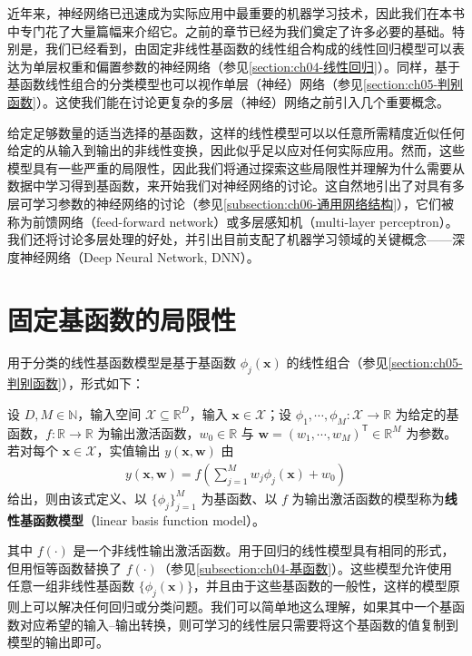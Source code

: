\documentclass[../../main.tex]{subfiles}
\begin{document}
近年来，神经网络已迅速成为实际应用中最重要的机器学习技术，因此我们在本书中专门花了大量篇幅来介绍它。之前的章节已经为我们奠定了许多必要的基础。特别是，我们已经看到，由固定非线性基函数的线性组合构成的线性回归模型可以表达为单层权重和偏置参数的神经网络（参见\cref{section:ch04-线性回归}）。同样，基于基函数线性组合的分类模型也可以视作单层（神经）网络（参见\cref{section:ch05-判别函数}）。这使我们能在讨论更复杂的多层（神经）网络之前引入几个重要概念。

给定足够数量的适当选择的基函数，这样的线性模型可以以任意所需精度近似任何给定的从输入到输出的非线性变换，因此似乎足以应对任何实际应用。然而，这些模型具有一些严重的局限性，因此我们将通过探索这些局限性并理解为什么需要从数据中学习得到基函数，来开始我们对神经网络的讨论。这自然地引出了对具有多层可学习参数的神经网络的讨论（参见\cref{subsection:ch06-通用网络结构}），它们被称为前馈网络（feed-forward network）或多层感知机（multi-layer perceptron）。我们还将讨论多层处理的好处，并引出目前支配了机器学习领域的关键概念——深度神经网络（Deep Neural Network, DNN）。

\section{固定基函数的局限性}\label{section:ch06-固定基函数的局限性}

用于分类的线性基函数模型是基于基函数 $\phi_j(\boldsymbol{x})$ 的线性组合（参见\cref{section:ch05-判别函数}），形式如下：

\begin{definition}[线性基函数模型]\label{definition:ch06-线性基函数模型}
设 $D,M\in\mathbb{N}$，输入空间 $\mathcal{X}\subseteq\mathbb{R}^{D}$，输入 $\boldsymbol{x}\in\mathcal{X}$；设 $\phi_{1},\cdots,\phi_{M}:\mathcal{X}\to\mathbb{R}$ 为给定的基函数，$f:\mathbb{R}\to\mathbb{R}$ 为输出激活函数，$w_{0}\in\mathbb{R}$ 与 $\boldsymbol{w}=(w_{1},\cdots,w_{M})^{\mathsf T}\in\mathbb{R}^{M}$ 为参数。若对每个 $\boldsymbol{x}\in\mathcal{X}$，实值输出 $y(\boldsymbol{x},\boldsymbol{w})$ 由
\begin{align}
y(\boldsymbol{x},\boldsymbol{w})=f\!\left(\sum_{j=1}^{M}w_j\phi_j(\boldsymbol{x})+w_0\right)
\label{align:ch06-线性基函数}
\end{align}
给出，则由该式定义、以 $\{\phi_j\}_{j=1}^{M}$ 为基函数、以 $f$ 为输出激活函数的模型称为\textbf{线性基函数模型}（linear basis function model）。
\end{definition}

其中 $f(\cdot)$ 是一个非线性输出激活函数。用于回归的线性模型具有相同的形式，但用恒等函数替换了 $f(\cdot)$（参见\cref{subsection:ch04-基函数}）。这些模型允许使用任意一组非线性基函数 $\{\phi_j(\boldsymbol{x})\}$，并且由于这些基函数的一般性，这样的模型原则上可以解决任何回归或分类问题。我们可以简单地这么理解，如果其中一个基函数对应希望的输入--输出转换，则可学习的线性层只需要将这个基函数的值复制到模型的输出即可。
\end{document}
